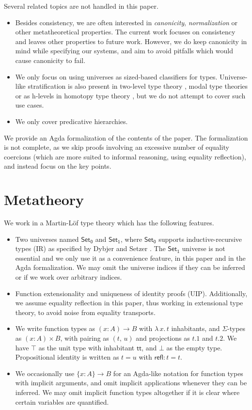 \documentclass[a4paper,UKenglish,cleveref, autoref, thm-restate]{lipics-v2021}
\theoremstyle{remark}
\theoremstyle{definition}
\newcommand{\Set}[1]{\mathsf{Set_{#1}}}
\newcommand{\refl}{\mathsf{refl}}
\renewcommand{\tt}{\mathsf{tt}}
\begin{document}
\noindent Several related topics are not handled in this paper.

\begin{itemize}

\item
Besides consistency, we are often interested in \emph{canonicity},
\emph{normalization} or other metatheoretical properties. The current work
focuses on consistency and leaves other properties to future work. However, we
do keep canonicity in mind while specifying our systems, and aim to avoid
pitfalls which would cause canonicity to fail.
\item
We only focus on using universes as sized-based classifiers for
types. Universe-like stratification is also present in two-level type theory
\cite{twolevel}, modal type theories \cite{gratzer20multimodal} or as h-levels
in homotopy type theory \cite{hottbook}, but we do not attempt to cover such use
cases.
\item
We only cover predicative hierarchies.
\end{itemize}

We provide an Agda formalization of the contents of the paper. The formalization
is not complete, as we skip proofs involving an excessive number of equality
coercions (which are more suited to informal reasoning, using equality
reflection), and instead focus on the key points.

\section{Metatheory}
\label{sec:metatheory}

We work in a Martin-Löf type theory which has the following features.
\begin{itemize}
  \item Two universes named $\Set0$ and $\Set1$, where $\Set0$ supports
    inductive-recursive types (IR) as specified by Dybjer and Setzer
    \cite{dybjer99finite}. The $\Set1$ universe is not essential and we only use
    it as a convenience feature, in this paper and in the Agda formalization. We
    may omit the universe indices if they can be inferred or if we work over
    arbitrary indices.
  \item Function extensionality and uniqueness of identity proofs
    (UIP). Additionally, we assume equality reflection in this paper, thus
    working in extensional type theory, to avoid noise from equality transports.
  \item We write function types as $(x : A)\to B$ with $\lambda\,x.\,t$
    inhabitants, and $\Sigma$-types as $(x : A) \times B$, with pairing as
    $(t,\, u)$ and projections as $t.1$ and $t.2$. We have $\top$ as the unit
    type with inhabitant $\tt$, and $\bot$ as the empty type. Propositional identity
    is written as $t = u$ with $\refl : t = t$.
  \item We occasionally use $\{x : A\} \to B$ for an Agda-like notation for
    function types with implicit arguments, and omit implicit applications
    whenever they can be inferred. We may omit implicit function types
    altogether if it is clear where certain variables are quantified.
\end{itemize}
\end{document}
